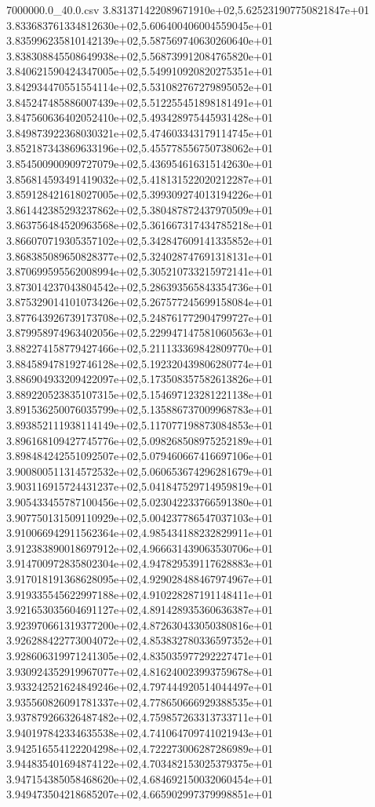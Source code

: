 \begin{filecontents*}{7000000.0_40.0.csv}
3.831371422089671910e+02,5.625231907750821847e+01
3.833683761334812630e+02,5.606400406004559045e+01
3.835996235810142139e+02,5.587569740630260640e+01
3.838308845508649938e+02,5.568739912084765820e+01
3.840621590424347005e+02,5.549910920820275351e+01
3.842934470551554114e+02,5.531082767279895052e+01
3.845247485886007439e+02,5.512255451898181491e+01
3.847560636402052410e+02,5.493428975445931428e+01
3.849873922368030321e+02,5.474603343179114745e+01
3.852187343869633196e+02,5.455778556750738062e+01
3.854500900909727079e+02,5.436954616315142630e+01
3.856814593491419032e+02,5.418131522020212287e+01
3.859128421618027005e+02,5.399309274013194226e+01
3.861442385293237862e+02,5.380487872437970509e+01
3.863756484520963568e+02,5.361667317434785218e+01
3.866070719305357102e+02,5.342847609141335852e+01
3.868385089650828377e+02,5.324028747691318131e+01
3.870699595562008994e+02,5.305210733215972141e+01
3.873014237043804542e+02,5.286393565843354736e+01
3.875329014101073426e+02,5.267577245699158084e+01
3.877643926739173708e+02,5.248761772904799727e+01
3.879958974963402056e+02,5.229947147581060563e+01
3.882274158779427466e+02,5.211133369842809770e+01
3.884589478192746128e+02,5.192320439806280774e+01
3.886904933209422097e+02,5.173508357582613826e+01
3.889220523835107315e+02,5.154697123281221138e+01
3.891536250076035799e+02,5.135886737009968783e+01
3.893852111938114149e+02,5.117077198873084853e+01
3.896168109427745776e+02,5.098268508975252189e+01
3.898484242551092507e+02,5.079460667416697106e+01
3.900800511314572532e+02,5.060653674296281679e+01
3.903116915724431237e+02,5.041847529714959819e+01
3.905433455787100456e+02,5.023042233766591380e+01
3.907750131509110929e+02,5.004237786547037103e+01
3.910066942911562364e+02,4.985434188232829911e+01
3.912383890018697912e+02,4.966631439063530706e+01
3.914700972835802304e+02,4.947829539117628883e+01
3.917018191368628095e+02,4.929028488467974967e+01
3.919335545622997188e+02,4.910228287191148411e+01
3.921653035604691127e+02,4.891428935360636387e+01
3.923970661319377200e+02,4.872630433050380816e+01
3.926288422773004072e+02,4.853832780336597352e+01
3.928606319971241305e+02,4.835035977292227471e+01
3.930924352919967077e+02,4.816240023993759678e+01
3.933242521624849246e+02,4.797444920514044497e+01
3.935560826091781337e+02,4.778650666929388535e+01
3.937879266326487482e+02,4.759857263313733711e+01
3.940197842334635538e+02,4.741064709741021943e+01
3.942516554122204298e+02,4.722273006287286989e+01
3.944835401694874122e+02,4.703482153025379375e+01
3.947154385058468620e+02,4.684692150032060454e+01
3.949473504218685207e+02,4.665902997379998851e+01

\end{filecontents*}
